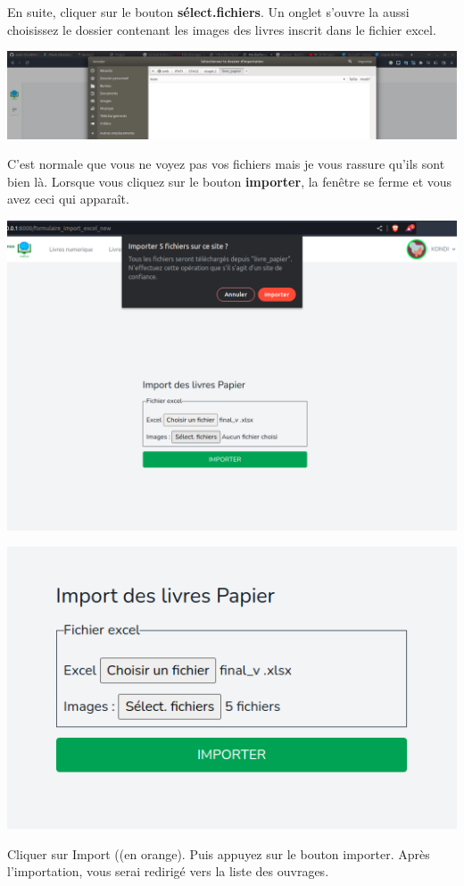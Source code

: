 \documentclass[12pt,a4paper]{article}
\begin{document}
\begin{itemize}
\begin{center}
\end{center}
En suite, cliquer sur le bouton \textbf{sélect.fichiers}.
Un onglet s'ouvre la aussi choisissez le dossier contenant les images des livres inscrit dans le fichier
excel.
\begin{center}
\includegraphics[scale=0.2]{img/open_file2.png}
\end{center}
C'est normale que vous ne voyez pas vos fichiers mais je vous rassure qu'ils sont bien là.
Lorsque vous cliquez sur le bouton \textbf{importer}, la fenêtre se ferme et vous avez ceci qui apparaît.
\begin{center}
\includegraphics[scale=0.4]{img/confirm_import.png}
\end{center}
\begin{center}
\includegraphics[scale=0.5]{img/import_lp_save.png}
\end{center}
Cliquer sur Import ((en orange).
Puis appuyez sur le bouton importer. Après l'importation, vous serai redirigé vers la liste des ouvrages.


\end{itemize}
\end{document}
